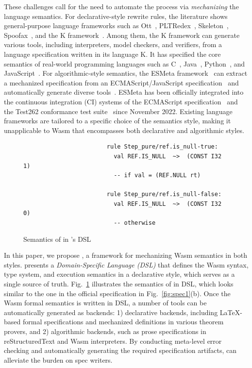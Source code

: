 These challenges call for the need to automate the process via \textit{mechanizing} the language semantics.
For declarative-style rewrite rules, the literature shows general-purpose language frameworks such as
Ott~\cite{ott}, PLTRedex~\cite{pltredex}, Skeleton~\cite{skeleton}, Spoofax~\cite{spoofax},
and the K framework~\cite{k}. Among them, the K framework can generate various tools,
including interpreters, model checkers, and verifiers, from a language specification written in its language K.
It has specified the core semantics of real-world programming languages
such as C~\cite{kc}, Java~\cite{kjava}, Python~\cite{kpython}, and JavaScript~\cite{kjs}.
For algorithmic-style semantics, the ESMeta framework~\cite{esmeta}
can extract a mechanized specification from
an ECMAScript/JavaScript specification~\cite{ecmascript} and automatically
generate diverse tools~\cite{jiset,jest,jstar,jsaver}.
ESMeta has been officially integrated into the continuous integration (CI) systems of
the ECMAScript specification~\cite{ciecma262} and the Test262 conformance test suite~\cite{citest262}
since November 2022.
Existing language frameworks are tailored to a specific choice of the semantics style, 
making it unapplicable to Wasm that encompasses both declarative and algorithmic styles.

\begin{figure}[t]
\footnotesize
\begin{verbatim}
                        rule Step_pure/ref.is_null-true:
                          val REF.IS_NULL  ~>  (CONST I32 1)
                          -- if val = (REF.NULL rt)

                        rule Step_pure/ref.is_null-false:
                          val REF.IS_NULL  ~>  (CONST I32 0)
                          -- otherwise
\end{verbatim}
\caption{Semantics of  in \dslname's DSL}
\label{fig:dsl}
\end{figure}

In this paper, we propose \dslname, a framework for mechanizing Wasm semantics in both styles.
\dslname presents a \emph{Domain-Specific Language (DSL)} that
defines the Wasm syntax, type system, and execution semantics in a declarative style,
which serves as a single source of truth.
Fig.~\ref{fig:dsl} illustrates the semantics of  in DSL,
which looks similar to the one in the official specification in Fig.~\ref{fig:spec1}(b).
Once the Wasm formal semantics is written in DSL,
a number of tools can be automatically generated as backends:
1) declarative backends, including LaTeX-based formal specifications and
mechanized definitions in various theorem provers, and
2) algorithmic backends, such as prose specifications in reStructuredText and Wasm interpreters.
By conducting meta-level error checking and automatically generating the required specification artifacts,
\dslname can alleviate the burden on spec writers.

